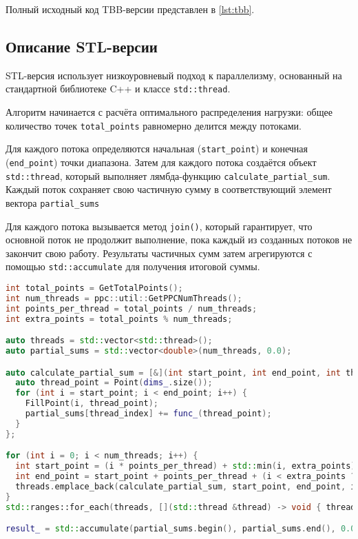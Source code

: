 \documentclass[a4paper,12pt]{article}
\begin{document}
  Полный исходный код TBB-версии представлен в \autoref{lst:tbb}.

  \subsection{Описание STL-версии}\label{subsec:stl_impl}

  STL-версия использует низкоуровневый подход к параллелизму, основанный на стандартной библиотеке C++ и классе \texttt{std::thread}.

  Алгоритм начинается с расчёта оптимального распределения нагрузки: общее количество точек \texttt{total\_points} равномерно делится между потоками.

  Для каждого потока определяются начальная (\texttt{start\_point}) и конечная (\texttt{end\_point}) точки диапазона.
  Затем для каждого потока создаётся объект \texttt{std::thread}, который выполняет лямбда-функцию \texttt{calculate\_partial\_sum}.
  Каждый поток сохраняет свою частичную сумму в соответствующий элемент вектора \texttt{partial\_sums}

  Для каждого потока вызывается метод \texttt{join()}, который гарантирует, что основной поток не продолжит выполнение, пока каждый из созданных потоков не закончит свою работу.
  Результаты частичных сумм затем агрегируются с помощью \texttt{std::accumulate} для получения итоговой суммы.

  \begin{lstlisting}[language=C++, caption=Ключевой фрагмент STL-версии,label={lst:stl-fragment}]
int total_points = GetTotalPoints();
int num_threads = ppc::util::GetPPCNumThreads();
int points_per_thread = total_points / num_threads;
int extra_points = total_points % num_threads;

auto threads = std::vector<std::thread>();
auto partial_sums = std::vector<double>(num_threads, 0.0);

auto calculate_partial_sum = [&](int start_point, int end_point, int thread_index) -> void {
  auto thread_point = Point(dims_.size());
  for (int i = start_point; i < end_point; i++) {
    FillPoint(i, thread_point);
    partial_sums[thread_index] += func_(thread_point);
  }
};

for (int i = 0; i < num_threads; i++) {
  int start_point = (i * points_per_thread) + std::min(i, extra_points);
  int end_point = start_point + points_per_thread + (i < extra_points ? 1 : 0);
  threads.emplace_back(calculate_partial_sum, start_point, end_point, i);
}
std::ranges::for_each(threads, [](std::thread &thread) -> void { thread.join(); });

result_ = std::accumulate(partial_sums.begin(), partial_sums.end(), 0.0) * GetScalingFactor();
  \end{lstlisting}
\end{document}
